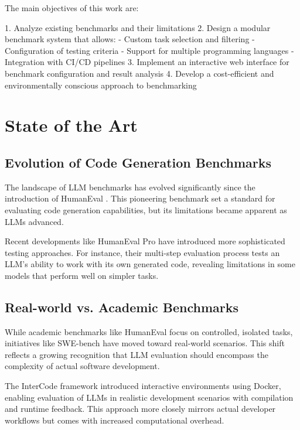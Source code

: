 The main objectives of this work are:

1. Analyze existing benchmarks and their limitations
2. Design a modular benchmark system that allows:
   - Custom task selection and filtering
   - Configuration of testing criteria
   - Support for multiple programming languages
   - Integration with CI/CD pipelines
3. Implement an interactive web interface for benchmark configuration and result analysis
4. Develop a cost-efficient and environmentally conscious approach to benchmarking

\chapter{State of the Art}

\section{Evolution of Code Generation Benchmarks}

The landscape of LLM benchmarks has evolved significantly since the introduction of HumanEval \cite{humaneval2021}. This pioneering benchmark set a standard for evaluating code generation capabilities, but its limitations became apparent as LLMs advanced.

Recent developments like HumanEval Pro \cite{humanevalprombpp2024} have introduced more sophisticated testing approaches. For instance, their multi-step evaluation process tests an LLM's ability to work with its own generated code, revealing limitations in some models that perform well on simpler tasks.

\section{Real-world vs. Academic Benchmarks}

While academic benchmarks like HumanEval focus on controlled, isolated tasks, initiatives like SWE-bench \cite{swebench2023} have moved toward real-world scenarios. This shift reflects a growing recognition that LLM evaluation should encompass the complexity of actual software development.

The InterCode framework \cite{intercode2023} introduced interactive environments using Docker, enabling evaluation of LLMs in realistic development scenarios with compilation and runtime feedback. This approach more closely mirrors actual developer workflows but comes with increased computational overhead.

